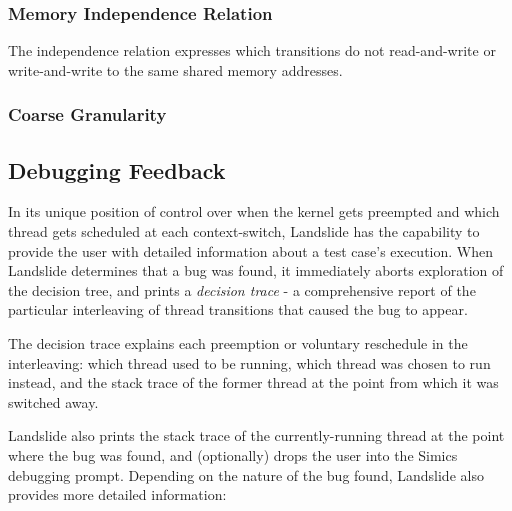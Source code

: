 \subsubsection{Memory Independence Relation}

The independence relation expresses which transitions do not read-and-write or write-and-write to the same shared memory addresses.

\subsubsection{Coarse Granularity}

\subsection{Debugging Feedback}

In its unique position of control over when the kernel gets preempted and which thread gets scheduled at each context-switch, Landslide has the capability to provide the user with detailed information about a test case's execution.
When Landslide determines that a bug was found, it immediately aborts exploration of the decision tree, and prints a {\em decision trace} - a comprehensive report of the particular interleaving of thread transitions that caused the bug to appear.

The decision trace explains each preemption or voluntary reschedule in the interleaving: which thread used to be running, which thread was chosen to run instead, and the stack trace of the former thread at the point from which it was switched away.

Landslide also prints the stack trace of the currently-running thread at the point where the bug was found, and (optionally) drops the user into the Simics debugging prompt. Depending on the nature of the bug found, Landslide also provides more detailed information:


